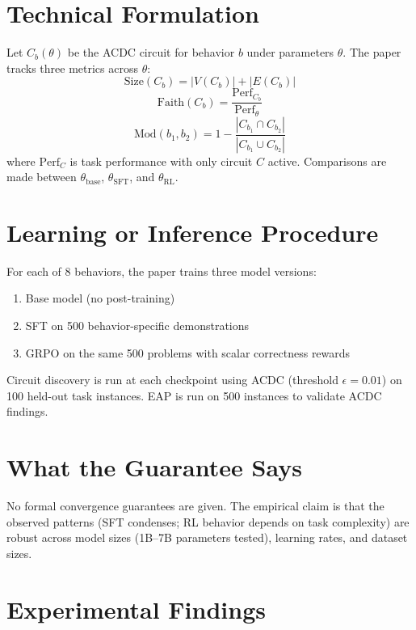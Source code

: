\documentclass[10pt,twocolumn]{article}
\begin{document}
\section{Technical Formulation}

Let $C_b(\theta)$ be the ACDC circuit for behavior $b$ under
parameters $\theta$. The paper tracks three metrics across $\theta$:
\[
  \text{Size}(C_b) = |V(C_b)| + |E(C_b)|
\]
\[
  \text{Faith}(C_b) = \frac{\text{Perf}_{C_b}}{\text{Perf}_\theta}
\]
\[
  \text{Mod}(b_1, b_2) = 1 - \frac{|C_{b_1} \cap C_{b_2}|}{|C_{b_1} \cup C_{b_2}|}
\]
where $\text{Perf}_{C}$ is task performance with only circuit $C$
active. Comparisons are made between $\theta_\text{base}$,
$\theta_\text{SFT}$, and $\theta_\text{RL}$.

\section{Learning or Inference Procedure}

For each of 8 behaviors, the paper trains three model versions:
\begin{enumerate}[itemsep=2pt,parsep=0pt]
  \item Base model (no post-training)
  \item SFT on 500 behavior-specific demonstrations
  \item GRPO on the same 500 problems with scalar correctness rewards
\end{enumerate}

Circuit discovery is run at each checkpoint using ACDC (threshold
$\epsilon = 0.01$) on 100 held-out task instances. EAP is run on
500 instances to validate ACDC findings.

\section{What the Guarantee Says}

No formal convergence guarantees are given. The empirical claim
is that the observed patterns (SFT condenses; RL behavior depends
on task complexity) are robust across model sizes (1B--7B parameters
tested), learning rates, and dataset sizes.

\section{Experimental Findings}
\end{document}
